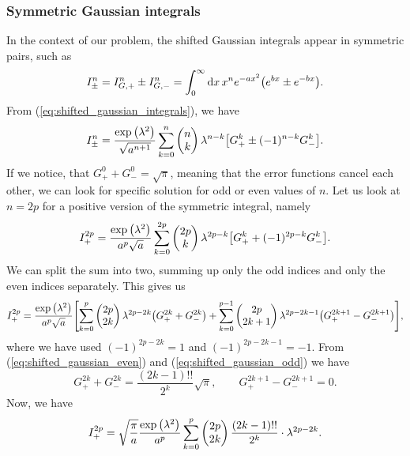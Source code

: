 \documentclass[aps,prl,preprint,groupedaddress,10pt]{revtex4-2}
\begin{document}
\subsubsection{Symmetric Gaussian integrals}
In the context of our problem, the shifted Gaussian integrals appear in symmetric pairs,
such as
\begin{equation}
    I^{n}_{\pm}=I^{n}_{G,+}\pm I^{n}_{G,-}=\int_{0}^{\infty}\dd{x}x^n e^{-ax^2}
    \pqty{e^{bx}\pm e^{-bx}}.
\end{equation}
From (\ref{eq:shifted_gaussian_integrals}), we have
\begin{equation}
    I^{n}_{\pm}=\frac{\exp\pqty{\lambda^2}}{\sqrt{a^{n+1}}}\sum_{k=0}^{n}\pmqty{n\\k}\lambda^{n-k}
    \bqty{G^k_{+}\pm(-1)^{n-k}G^k_{-}}.
\end{equation}
If we notice, that $G^0_{+}+G^0_{-}=\sqrt{\pi}$, meaning that the error functions cancel each other,
we can look for specific solution for odd or even values of $n$. Let us look at $n=2p$ for a positive
version of the symmetric integral, namely
\begin{equation}
    I^{2p}_{+}=\frac{\exp\pqty{\lambda^2}}{a^p\sqrt{a}}\sum_{k=0}^{2p}\pmqty{2p\\k}\lambda^{2p-k}
    \bqty{G^{k}_{+}+(-1)^{2p-k}G^{k}_{-}}.
\end{equation}
We can split the sum into two, summing up only the odd indices and only the even indices separately.
This gives us
\begin{equation}
    I^{2p}_{+}=\frac{\exp\pqty{\lambda^2}}{a^p\sqrt{a}}
    \bqty{\sum_{k=0}^{p}\pmqty{2p\\2k}\lambda^{2p-2k}\pqty{G^{2k}_{+}+G^{2k}_{-}}+
    \sum_{k=0}^{p-1}\pmqty{2p\\2k+1}\lambda^{2p-2k-1}\pqty{G^{2k+1}_{+}-G^{2k+1}_{-}}},
\end{equation}
where we have used $(-1)^{2p-2k}=1$ and $(-1)^{2p-2k-1}=-1$. From (\ref{eq:shifted_gaussian_even})
and (\ref{eq:shifted_gaussian_odd}) we have
\begin{equation}
    G^{2k}_{+}+G^{2k}_{-}=\frac{(2k-1)!!}{2^{k}}\sqrt{\pi},\qquad
    G^{2k+1}_{+}-G^{2k+1}_{-}=0.
\end{equation}
Now, we have
\begin{equation}\label{eq:symmetric_positive_even_integral}
    I^{2p}_{+}=\sqrt{\frac{\pi}{a}}\frac{\exp\pqty{\lambda^2}}{a^p}
    \sum_{k=0}^{p}\pmqty{2p\\2k}\frac{(2k-1)!!}{2^k}\cdot\lambda^{2p-2k}.
\end{equation}
\end{document}
